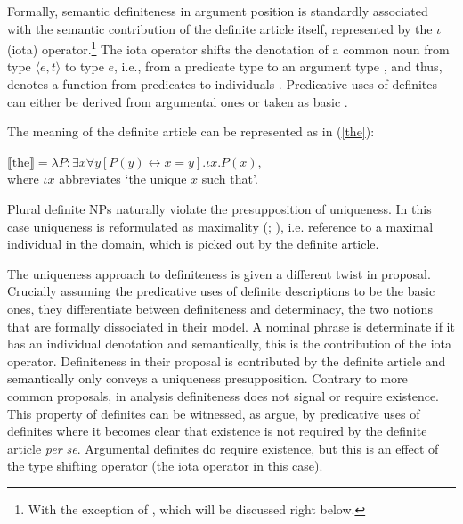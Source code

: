 \documentclass[output=paper,colorlinks,citecolor=brown]{langscibook}
\begin{document}
Formally, semantic definiteness in argument position is standardly associated with the semantic contribution of the definite article itself, represented by the $\iota$ (iota) operator.\footnote{With the exception of \citet{coppockbeaver15}, which will be discussed right below.} The iota operator shifts the denotation of a common noun from type {$\langle e,t \rangle$} to type {$e$}, i.e., from a predicate type to an argument type \citep[see][998]{Heim2011}, and thus, denotes a function from predicates to individuals \citep{frege79, lobner85, elbourne05, elbourne13, Heim2011}. Predicative uses of definites can either be derived from argumental ones \citep{partee87, winter01} or taken as basic \citep{grafffara01,coppockbeaver15}. 

The meaning of the definite article can be represented as in (\ref{the}):

\ea \label{the}
$\llbracket\text{the}\rrbracket = \lambda{P}:\exists x \forall y [P(y)\leftrightarrow x = y].  \iota x.P(x)$,\\
where $\iota x$ abbreviates `the unique $x$ such that'. \hfill\citep[][998]{Heim2011}
\z 



\noindent Plural definite NPs naturally violate the presupposition of uniqueness. In this case uniqueness is reformulated as maximality (\citealt{sharvy80}; \citealt{link83}), i.e. reference to a maximal individual in the domain, which is picked out by the definite article.

The uniqueness approach to definiteness is given a different twist in  proposal. Crucially assuming the predicative uses of definite descriptions to be the basic ones, they differentiate between definiteness and determinacy, the two notions that are formally dissociated in their model. A nominal phrase is determinate if it has an individual denotation and semantically, this is the contribution of the iota operator. Definiteness in their proposal is contributed by the definite article and semantically only conveys a uniqueness presupposition. Contrary to more common proposals, in  analysis definiteness does not signal or require existence. This property of definites can be witnessed, as \citet{coppockbeaver15} argue, by predicative uses of definites where it becomes clear that existence is not required by the definite article \textit{per se}. Argumental definites do require existence, but this is an effect of the type shifting operator (the iota operator in this case). 
\end{document}
